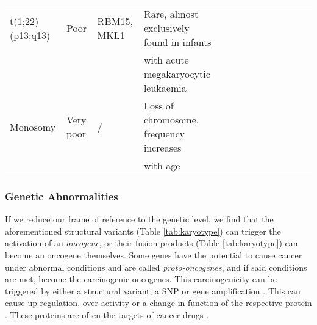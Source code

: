 \begin{landscape}
\begin{table}[h]
\begin{tabular}{lllllllllllll}
        t(1;22) (p13;q13) & Poor & RBM15, MKL1 & Rare, almost exclusively found in infants   & \cite{carroll1991t} & ~ \\ 
        ~ & ~ & ~ &  with acute megakaryocytic leukaemia & \cite{bernstein2000nineteen} & ~ \\ \hline
        Monosomy  & Very poor & / & Loss of chromosome, frequency increases & \cite{breems2008monosomal} & ~ \\ 
        ~ & ~ & ~ &  with age &   & ~ \\ \bottomrule
    \end{tabular}
\end{table}
\end{landscape}





\subsubsection{Genetic Abnormalities}

If we reduce our frame of reference to the genetic level, we find that the aforementioned structural variants (Table \ref{tab:karyotype}) can trigger the activation of an \textit{oncogene}, or their fusion products (Table \ref{tab:karyotype}) can become an oncogene themselves. Some genes have the potential to cause cancer under abnormal conditions and are called \textit{proto-oncogenes}, and if said conditions are met, become the carcinogenic oncogenes. This carcinogenicity can be triggered by either a structural variant, a \ac{SNP} or gene amplification \citep{tabin1982mechanism}. This can cause up-regulation, over-activity or a change in function of the respective protein \citep{tabin1982mechanism}. These proteins are often the targets of cancer drugs \citep{liu2004new}.


